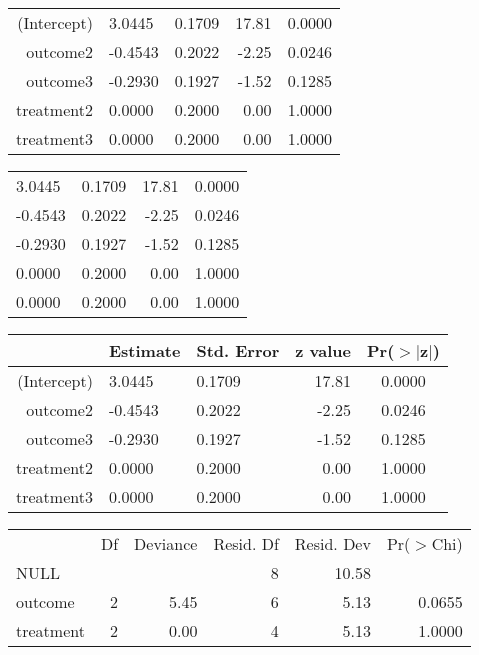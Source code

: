 \begin{table}[ht]
\centering
\begin{tabular}{r||llrc}
  \hline
  \hline
(Intercept) & 3.0445 & 0.1709 & 17.81 & 0.0000 \\ 
  outcome2 & -0.4543 & 0.2022 & -2.25 & 0.0246 \\ 
  outcome3 & -0.2930 & 0.1927 & -1.52 & 0.1285 \\ 
  treatment2 & 0.0000 & 0.2000 & 0.00 & 1.0000 \\ 
  treatment3 & 0.0000 & 0.2000 & 0.00 & 1.0000 \\ 
   \hline
\end{tabular}
\end{table}
\begin{table}[ht]
\centering
\begin{tabular}{||llrc}
  \hline
  \hline
3.0445 & 0.1709 & 17.81 & 0.0000 \\ 
  -0.4543 & 0.2022 & -2.25 & 0.0246 \\ 
  -0.2930 & 0.1927 & -1.52 & 0.1285 \\ 
  0.0000 & 0.2000 & 0.00 & 1.0000 \\ 
  0.0000 & 0.2000 & 0.00 & 1.0000 \\ 
   \hline
\end{tabular}
\end{table}
\begin{table}[ht]
\centering
\begin{tabular}{|r||llrc|}
  \hline
 & Estimate & Std. Error & z value & Pr($>$$|$z$|$) \\ 
  \hline
(Intercept) & 3.0445 & 0.1709 & 17.81 & 0.0000 \\ 
  outcome2 & -0.4543 & 0.2022 & -2.25 & 0.0246 \\ 
  outcome3 & -0.2930 & 0.1927 & -1.52 & 0.1285 \\ 
  treatment2 & 0.0000 & 0.2000 & 0.00 & 1.0000 \\ 
  treatment3 & 0.0000 & 0.2000 & 0.00 & 1.0000 \\ 
   \hline
\end{tabular}
\end{table}
\begin{table}[ht]
\centering
\begingroup\small
\begin{tabular}{lrrrrr}
  & Df & Deviance & Resid. Df & Resid. Dev & Pr($>$Chi) \\ 
 NULL &  &  & 8 & 10.58 &  \\ 
   \hline
outcome & 2 & 5.45 & 6 & 5.13 & 0.0655 \\ 
  treatment & 2 & 0.00 & 4 & 5.13 & 1.0000 \\ 
  \end{tabular}
\endgroup
\end{table}
